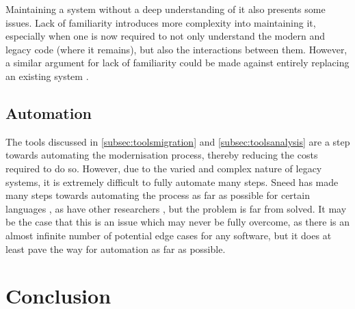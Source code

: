\documentclass[12pt,journal,compsoc]{IEEEtran}
\begin{document}
Maintaining a system without a deep understanding of it also presents some issues. Lack of familiarity introduces more complexity into maintaining it, especially when one is now required to not only understand the modern and legacy code (where it remains), but also the interactions between them. However, a similar argument for lack of familiarity could be made against entirely replacing an existing system \cite{Almonaies2010}.

\subsection{Automation}
\label{subsec:automation}
The tools discussed in \autoref{subsec:toolsmigration} and \autoref{subsec:toolsanalysis} are a step towards automating the modernisation process, thereby reducing the costs required to do so. However, due to the varied and complex nature of legacy systems, it is extremely difficult to fully automate many steps. Sneed has made many steps towards automating the process as far as possible for certain languages \cite{Sneed2013,Sneed2011,Sneed2008,Sneed2009,Sneed1996,Sneed2001}, as have other researchers \cite{Deursen1998,Aversano2001,Chiang2001,Wu2005,O'Brien2005,Distante2006}, but the problem is far from solved. It may be the case that this is an issue which may never be fully overcome, as there is an almost infinite number of potential edge cases for any software, but it does at least pave the way for automation as far as possible.

\section{Conclusion}
\label{sec:conclusion}


\appendices



\ifCLASSOPTIONcompsoc
\end{document}
